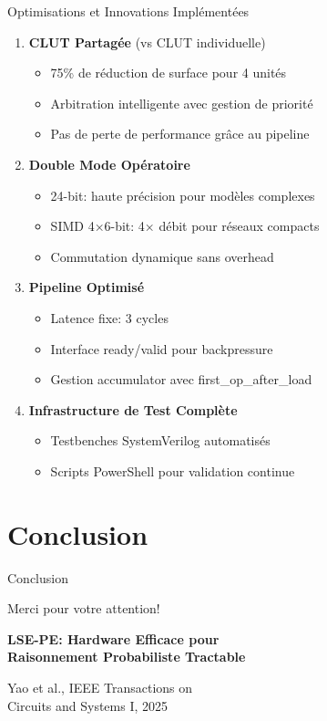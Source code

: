 \documentclass[aspectratio=169]{beamer}
\begin{document}
\begin{frame}{Optimisations et Innovations Implémentées}
\begin{enumerate}
\item \textbf{CLUT Partagée} (vs CLUT individuelle)
   \begin{itemize}
   \item 75\% de réduction de surface pour 4 unités
   \item Arbitration intelligente avec gestion de priorité
   \item Pas de perte de performance grâce au pipeline
   \end{itemize}

\item \textbf{Double Mode Opératoire}
   \begin{itemize}
   \item 24-bit: haute précision pour modèles complexes
   \item SIMD 4×6-bit: 4× débit pour réseaux compacts
   \item Commutation dynamique sans overhead
   \end{itemize}

\item \textbf{Pipeline Optimisé}
   \begin{itemize}
   \item Latence fixe: 3 cycles
   \item Interface ready/valid pour backpressure
   \item Gestion accumulator avec first\_op\_after\_load
   \end{itemize}

\item \textbf{Infrastructure de Test Complète}
   \begin{itemize}
   \item Testbenches SystemVerilog automatisés
   \item Scripts PowerShell pour validation continue
   \end{itemize}
\end{enumerate}
\end{frame}

\section{Conclusion}

\begin{frame}{Conclusion}
\begin{center}
\Huge Merci pour votre attention!

\vspace{1cm}
\large
\textbf{LSE-PE: Hardware Efficace pour\\Raisonnement Probabiliste Tractable}

\vspace{0.5cm}
\normalsize
Yao et al., IEEE Transactions on\\
Circuits and Systems I, 2025

\vspace{1cm}
\end{center}
\end{frame}
\end{document}

